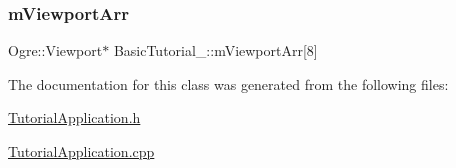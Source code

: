 \subsubsection{\texorpdfstring{m\+Viewport\+Arr}{mViewportArr}}
{\footnotesize\ttfamily Ogre\+::\+Viewport$\ast$ Basic\+Tutorial\+\_\+::m\+Viewport\+Arr\mbox{[}8\mbox{]}\hspace{0.3cm}{\ttfamily [protected]}}



The documentation for this class was generated from the following files\+:\begin{DoxyCompactItemize}
\item 
\hyperlink{_tutorial_application_8h}{Tutorial\+Application.\+h}\item 
\hyperlink{_tutorial_application_8cpp}{Tutorial\+Application.\+cpp}\end{DoxyCompactItemize}
